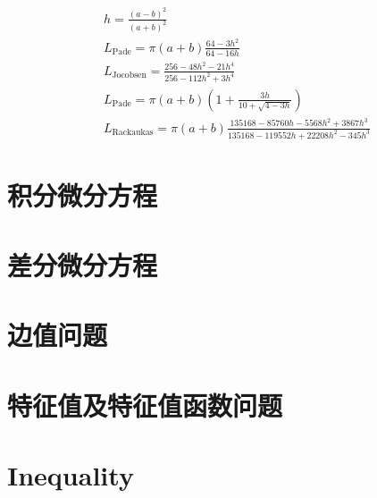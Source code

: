 \documentclass[UTF8]{../09-Mathematics}
\begin{document}
\begin{equation}
    \begin{split}
        & h = \frac{(a-b)^2}{(a+b)^2}\\
        &L_{\text{Pade}} = \pi (a+b)\frac{64-3h^2}{64-16h}\\
        &L_{\text{Jocobsen}} = \frac{256-48h^2-21h^4}{256-112h^2+3h^4}\\
        & L_{\text{Pade}} = \pi (a+b)(1+\frac{3h}{10+\sqrt{4-3h}})\\
        &L_{\text{Rackaukas}} = \pi (a+b)\frac{135168-85760h-5568h^2+3867h^3}{135168-119552h+22208h^2-345h^3}
    \end{split}
\end{equation}
 


\chapter{积分微分方程}
\chapter{差分微分方程}
\chapter{边值问题}
\chapter{特征值及特征值函数问题}




\chapter{Inequality}%
\end{document}
